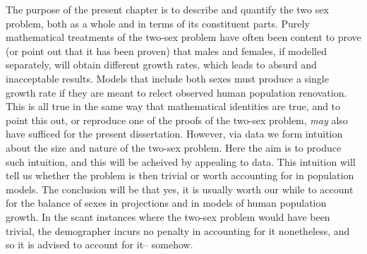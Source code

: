 
The purpose of the present chapter is to describe and quantify the two sex
problem, both as a whole and in terms of its constituent parts. Purely
mathematical treatments of the two-sex problem have often been content to 
prove (or point out that it has been proven) that males and females,
if modelled separately, will obtain different growth rates, which leads to
absurd and inacceptable results. Models that include both sexes must produce a
single growth rate if they are meant to relect observed human population renovation. This is all
true in the same way that mathematical identities are true, and to point this
out, or reproduce one of the proofs of the two-sex problem, \textit{may} also have sufficed for the
present dissertation. However, via data we form intuition about
the size and nature of the two-sex problem. Here the aim is to produce such
intuition, and this will be acheived by appealing to data. This intuition will
tell us whether the problem is then trivial or worth accounting for in
population models. The conclusion will be that yes, it is usually worth our
while to account for the balance of sexes in projections and in models of human
population growth. In the scant instances where the two-sex problem would have
been trivial, the demographer incurs no penalty in accounting for it
nonetheless, and so it is advised to account for it-- somehow.








